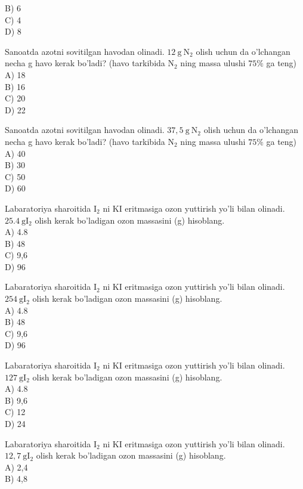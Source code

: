 B) 6\\
C) 4\\
D) 8
  \item Sanoatda azotni sovitilgan havodan olinadi. $12 \mathrm{~g} \mathrm{~N}_{2}$ olish uchun da o'lchangan necha g havo kerak bo'ladi? (havo tarkibida $\mathrm{N}_{2}$ ning massa ulushi $75 \%$ ga teng)\\
A) 18\\
B) 16\\
C) 20\\
D) 22
  \item Sanoatda azotni sovitilgan havodan olinadi. $37,5 \mathrm{~g} \mathrm{~N}_{2}$ olish uchun da o'lchangan necha g havo kerak bo'ladi? (havo tarkibida $\mathrm{N}_{2}$ ning massa ulushi $75 \%$ ga teng)\\
A) 40\\
B) 30\\
C) 50\\
D) 60
  \item Labaratoriya sharoitida $\mathrm{I}_{2}$ ni KI eritmasiga ozon yuttirish yo'li bilan olinadi. $25.4 \mathrm{~g} \mathrm{I}_{2}$ olish kerak bo'ladigan ozon massasini (g) hisoblang.\\
A) 4.8\\
B) 48\\
C) 9,6\\
D) 96
  \item Labaratoriya sharoitida $\mathrm{I}_{2}$ ni KI eritmasiga ozon yuttirish yo'li bilan olinadi. $254 \mathrm{~g} \mathrm{I}_{2}$ olish kerak bo'ladigan ozon massasini (g) hisoblang.\\
A) 4.8\\
B) 48\\
C) 9,6\\
D) 96
  \item Labaratoriya sharoitida $\mathrm{I}_{2}$ ni KI eritmasiga ozon yuttirish yo'li bilan olinadi. $127 \mathrm{~g} \mathrm{I}_{2}$ olish kerak bo'ladigan ozon massasini (g) hisoblang.\\
A) 4.8\\
B) 9,6\\
C) 12\\
D) 24
  \item Labaratoriya sharoitida $\mathrm{I}_{2}$ ni KI eritmasiga ozon yuttirish yo'li bilan olinadi. $12,7 \mathrm{~g} \mathrm{I}_{2}$ olish kerak bo'ladigan ozon massasini (g) hisoblang.\\
A) 2,4\\
B) 4,8\\
